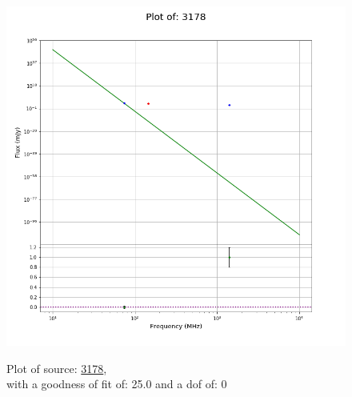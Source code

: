 \documentclass{article}
\begin{document}
\begin{figure}[H]
\begin{minipage}{0.5\textwidth}
        \includegraphics[scale = 0.35]{KmeulenSimSource_1hr/1hr3178.png}
        \captionsetup{labelformat=empty}
        \caption{Plot of source: \href{http://banana.transientskp.org/r4/vlo_KmeulenSimSource/runningcatalog/3178}{3178},\\with a goodness of fit of: 25.0 and a dof of: 0}
    \addtocounter{figure}{-1}
    \label{KmeulenSimSource:1hr:3178:plot}
    \end{minipage}
\end{figure}
\end{document}

